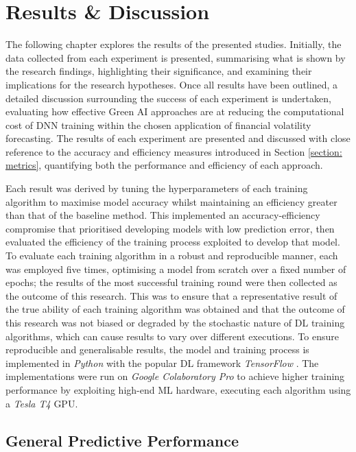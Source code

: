 \documentclass[a4paper, 11pt]{report}
\begin{document}
    \newpage
    \chapter{Results \& Discussion}
    \label{chapter: results-discussion}

    The following chapter explores the results of the presented studies. Initially, the data collected from each experiment is presented, summarising what is shown by the research findings, highlighting their significance, and examining their implications for the research hypotheses. Once all results have been outlined, a detailed discussion surrounding the success of each experiment is undertaken, evaluating how effective Green AI approaches are at reducing the computational cost of DNN training within the chosen application of financial volatility forecasting. The results of each experiment are presented and discussed with close reference to the accuracy and efficiency measures introduced in Section \ref{section: metrics}, quantifying both the performance and efficiency of each approach.
    
    Each result was derived by tuning the hyperparameters of each training algorithm to maximise model accuracy whilst maintaining an efficiency greater than that of the baseline method. This implemented an accuracy-efficiency compromise that prioritised developing models with low prediction error, then evaluated the efficiency of the training process exploited to develop that model. To evaluate each training algorithm in a robust and reproducible manner, each was employed five times, optimising a model from scratch over a fixed number of epochs; the results of the most successful training round were then collected as the outcome of this research. This was to ensure that a representative result of the true ability of each training algorithm was obtained and that the outcome of this research was not biased or degraded by the stochastic nature of DL training algorithms, which can cause results to vary over different executions. To ensure reproducible and generalisable results, the model and training process is implemented in \emph{Python} with the popular DL framework \emph{TensorFlow} \citep{abadi-2016}. The implementations were run on \emph{Google Colaboratory Pro} to achieve higher training performance by exploiting high-end ML hardware, executing each algorithm using a \emph{Tesla T4} GPU. 

    \section{General Predictive Performance}
\end{document}
